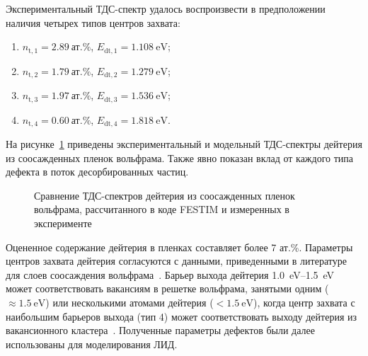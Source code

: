 Экспериментальный ТДС-спектр удалось воспроизвести в предположении наличия четырех типов центров захвата:
\begin{enumerate}[beginpenalty=10000]
    \item \( n_\mathrm{t,1}=\SI{2.89}{\text{ат.}\percent} \), \( E_\mathrm{dt,1}=\SI{1.108}{\electronvolt} \);
    \item \( n_\mathrm{t,2}=\SI{1.79}{\text{ат.}\percent} \), \( E_\mathrm{dt,2}=\SI{1.279}{\electronvolt} \);
    \item \( n_\mathrm{t,3}=\SI{1.97}{\text{ат.}\percent} \), \( E_\mathrm{dt,3}=\SI{1.536}{\electronvolt} \);
    \item \( n_\mathrm{t,4}=\SI{0.60}{\text{ат.}\percent} \), \( E_\mathrm{dt,4}=\SI{1.818}{\electronvolt} \).
\end{enumerate}
На рисунке~\cref{fig:ch4/LID_TDS} приведены экспериментальный и модельный ТДС-спектры дейтерия из соосажденных пленок вольфрама. Также явно показан вклад от каждого типа дефекта в поток десорбированных частиц.

\begin{figure}[ht]
    \caption{Сравнение ТДС-спектров дейтерия из соосажденных пленок вольфрама, рассчитанного в коде FESTIM и измеренных в эксперименте}\label{fig:ch4/LID_TDS}
\end{figure}

Оцененное содержание дейтерия в пленках составляет более 7 ат.\%. Параметры центров захвата дейтерия согласуются с данными, приведенными в литературе для слоев соосаждения вольфрама~\cite{Krat2018}. Барьер выхода дейтерия \SIrange{1.0}{1.5}{\electronvolt} может соответствовать вакансиям в решетке вольфрама, занятыми одним (\(\approx\SI{1.5}{\electronvolt}\)) или несколькими атомами дейтерия (\(<\SI{1.5}{\electronvolt}\)), когда центр захвата с наибольшим барьеров выхода (тип 4) может соответствовать выходу дейтерия из вакансионного кластера~\cite{Ogorodnikova2015}. Полученные параметры дефектов были далее использованы для моделирования ЛИД.


